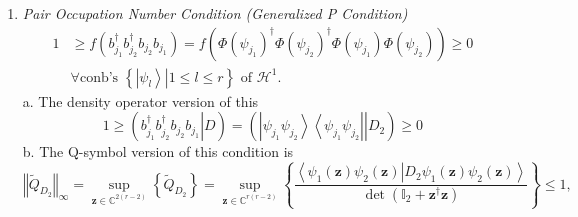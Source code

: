 \documentclass[aps,preprint]{revtex4}%
\begin{document}
\begin{enumerate}
\item[2.] \emph{Pair Occupation Number Condition (Generalized P Condition)}
\begin{align}
1  &  \geq f\left(  b_{j_{1}}^{\dagger}b_{j_{2}}^{\dagger}b_{j_{2}}b_{j_{1}%
}\right)  =f\left(  \Phi\left(  \psi_{j_{1}}\right)  ^{\dagger}\Phi\left(
\psi_{j_{2}}\right)  ^{\dagger}\Phi\left(  \psi_{j_{1}}\right)  \Phi\left(
\psi_{j_{2}}\right)  \right)  \geq0\nonumber\\
&  \forall\text{conb's }\left\{  \left.  \left\vert \psi_{l}\right\rangle
\right\vert 1\leq l\leq r\right\}  \text{ of }\mathcal{H}^{1}.
\end{align}
a. The density operator version of this
\begin{equation}
1\geq\left(  \left.  b_{j_{1}}^{\dagger}b_{j_{2}}^{\dagger}b_{j_{2}}b_{j_{1}%
}\right\vert D\right)  =\left(  \left.  \left\vert \psi_{j_{1}}\psi_{j_{2}%
}\right\rangle \left\langle \psi_{j_{1}}\psi_{j_{2}}\right\vert \right\vert
D_{2}\right)  \geq0
\end{equation}
b. The Q-symbol version of this condition is
\begin{equation}
\left\Vert \tilde{Q}_{D_{2}}\right\Vert _{\infty}=\sup_{\mathbf{z\in
}\mathbb{C}^{2\left(  r-2\right)  }}\left\{  \tilde{Q}_{D_{2}}\right\}
=\sup_{\mathbf{z\in}\mathbb{C}^{r\left(  r-2\right)  }}\left\{  \frac
{\left\langle \psi_{1}\left(  \mathbf{z}\right)  \psi_{2}\left(
\mathbf{z}\right)  \left\vert D_{2}\psi_{1}\left(  \mathbf{z}\right)  \psi
_{2}\left(  \mathbf{z}\right)  \right.  \right\rangle }{\det\left(
\mathbb{I}_{2}+\mathbf{z}^{\dagger}\mathbf{z}\right)  }\right\}
\leq1,\nonumber
\end{equation}



\end{enumerate}
\end{document}
